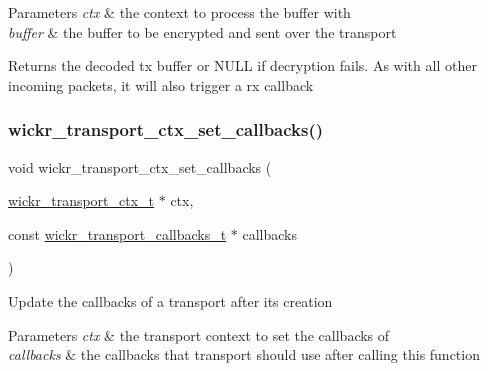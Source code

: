 \begin{DoxyParams}{Parameters}
{\em ctx} & the context to process the buffer with \\
\hline
{\em buffer} & the buffer to be encrypted and sent over the transport \\
\hline
\end{DoxyParams}
\begin{DoxyReturn}{Returns}
the decoded tx buffer or N\+U\+LL if decryption fails. As with all other incoming packets, it will also trigger a rx callback 
\end{DoxyReturn}
\mbox{\label{group__wickr__transport__ctx_ga9ed375c418ca58c30ca31c8303c71f92}} 
\subsubsection{\texorpdfstring{wickr\_transport\_ctx\_set\_callbacks()}{wickr\_transport\_ctx\_set\_callbacks()}}
{\footnotesize\ttfamily void wickr\+\_\+transport\+\_\+ctx\+\_\+set\+\_\+callbacks (\begin{DoxyParamCaption}\item[{\mbox{\hyperlink{structwickr__transport__ctx}{wickr\+\_\+transport\+\_\+ctx\+\_\+t}} $\ast$}]{ctx,  }\item[{const \mbox{\hyperlink{structwickr__transport__callbacks}{wickr\+\_\+transport\+\_\+callbacks\+\_\+t}} $\ast$}]{callbacks }\end{DoxyParamCaption})}

Update the callbacks of a transport after it\textquotesingle{}s creation


\begin{DoxyParams}{Parameters}
{\em ctx} & the transport context to set the callbacks of \\
\hline
{\em callbacks} & the callbacks that transport should use after calling this function \\
\hline
\end{DoxyParams}
\mbox{\label{group__wickr__transport__ctx_ga338125913ff273beec721b341de639a3}} 
